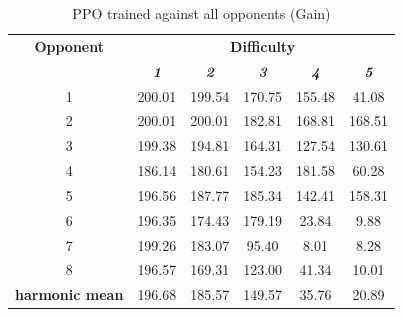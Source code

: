 \documentclass[conference]{IEEEtran}
\begin{document}
    \begin{table}[htbp]
        \caption{PPO trained against all opponents (Gain)}
        \begin{center}
            \begin{tabular}{|c|c|c|c|c|c|}
                \hline
                \textbf{Opponent}&\multicolumn{5}{|c|}{\textbf{Difficulty}} \\
                \cline{2-6}
                & \textbf{\textit{1}}& \textbf{\textit{2}}& \textbf{\textit{3}} & \textbf{\textit{4}} & \textbf{\textit{5}} \\
                \hline
                 1 &  200.01 &  199.54 &  170.75 &  155.48 &   41.08\\
                 2 &  200.01 &  200.01 &  182.81 &  168.81 &  168.51\\
                 3 &  199.38 &  194.81 &  164.31 &  127.54 &  130.61\\
                 4 &  186.14 &  180.61 &  154.23 &  181.58 &   60.28\\
                 5 &  196.56 &  187.77 &  185.34 &  142.41 &  158.31\\
                 6 &  196.35 &  174.43 &  179.19 &   23.84 &    9.88\\
                 7 &  199.26 &  183.07 &   95.40 &    8.01 &    8.28\\
                 8 &  196.57 &  169.31 &  123.00 &   41.34 &   10.01\\
                \hline
                \textbf{harmonic mean} & 196.68 & 185.57 & 149.57 & 35.76 & 20.89 \\
                \hline
            \end{tabular}
            \label{PPO against all opponents gain}
        \end{center}
    \end{table}
\end{document}
